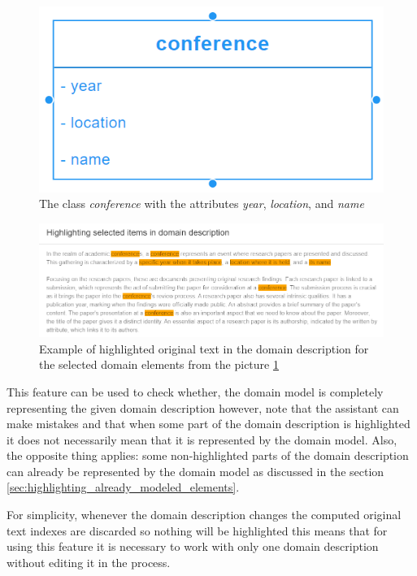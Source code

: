 \begin{figure}[!h]
    \includegraphics[scale=0.31]{../docs/images/frontend/class-example.png}
    \caption{\centering The class \textit{conference} with the attributes \textit{year}, \textit{location}, and \textit{name}}
    \label{fig:class_example}
\end{figure}


\begin{figure}[!h]
    \includegraphics[scale=0.56]{../docs/images/frontend/highlight-all-example.png}
    \caption{\centering Example of highlighted original text in the domain description for the selected domain elements from the picture \ref{fig:class_example}}
    \label{fig:highlight_all_example}
\end{figure}


This feature can be used to check whether, the domain model is completely representing the given domain description however, note that the assistant can make mistakes and that when some part of the domain description is highlighted it does not necessarily mean that it is represented by the domain model. Also, the opposite thing applies: some non-highlighted parts of the domain description can already be represented by the domain model as discussed in the section \ref{sec:highlighting_already_modeled_elements}.

For simplicity, whenever the domain description changes the computed original text indexes are discarded so nothing will be highlighted this means that for using this feature it is necessary to work with only one domain description without editing it in the process.


